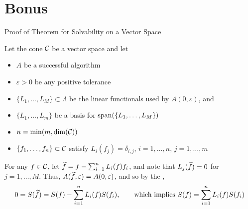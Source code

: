 \documentclass[11pt,compress,xcolor={usenames,dvipsnames},aspectratio=169]{beamer}
\begin{document}
\section{Bonus}
\begin{frame}[label = VectorSpaceThmProof]{Proof of Theorem for Solvability on a Vector Space}

\vspace{-3ex}

Let the cone $\mathcal{C}$ be a \alert{vector space} and let

\vspace{-3ex}
\begin{itemize}
    \item $A$ be a successful algorithm
    
    \item $\varepsilon > 0$ be any positive tolerance
    
    \item  $\{L_1, \ldots, L_{M}\} \subset \Lambda$ be the linear functionals used by $A(0,\varepsilon)$, and
    
    \item  $\{L_1, \ldots, L_m\}$ be a basis for $\operatorname{span}(\{L_1, \ldots, L_{M}\})$
    
    \item $n  = \min(m,\dim(\mathcal{C}))$
    
        \item $\{f_1, \ldots, f_n\} \subset \mathcal{C}$ satisfy $L_i(f_j) = \delta_{i,j}$, $i =1, \ldots, n$, $j=1, \ldots, m$
\end{itemize}

\vspace{-2ex}

For any $f \in \mathcal{C}$, let $\widetilde{f} = f- \sum_{i=1}^n L_i(f) f_i$, and note that $L_j(\widetilde{f}) = 0$ for $j =1, \ldots, M$.  Thus, $A(\widetilde{f},\varepsilon) = A(0,\varepsilon)$, and so by the \hyperlink{ZeroCorollary}{},
\[
0 = S(\widetilde{f}) = S(f) - \sum_{i=1}^n L_i(f) S(f_i), \qquad \text{which implies } S(f) = \sum_{i=1}^n L_i(f) S(f_i)
\]

\vspace{-3ex}
    \hyperlink{VectorSpaceThm}{}
\end{frame}
\end{document}
